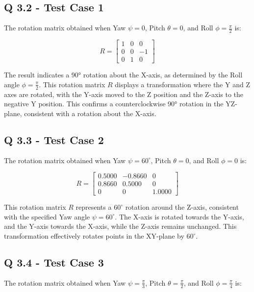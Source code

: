 \subsection{Q 3.2 - Test Case 1}

The rotation matrix obtained when Yaw \( \psi = 0 \), Pitch \( \theta = 0 \), and Roll \( \phi = \frac{\pi}{2} \) is:

\[
R = 
\begin{bmatrix}
1 & 0 & 0 \\
0 & 0 & -1 \\
0 & 1 & 0
\end{bmatrix}
\]

The result indicates a 90° rotation about the X-axis, as determined by the Roll angle \(\phi = \frac{\pi}{2}\). This rotation matrix \( R \) displays a transformation where the Y and Z axes are rotated, with the Y-axis moved to the Z position and the Z-axis to the negative Y position. This confirms a counterclockwise 90° rotation in the YZ-plane, consistent with a rotation about the X-axis.

\subsection{Q 3.3 - Test Case 2}

The rotation matrix obtained when Yaw \( \psi = 60^\circ \), Pitch \( \theta = 0 \), and Roll \( \phi = 0 \) is:

\[
R = 
\begin{bmatrix}
0.5000 & -0.8660 & 0 \\
0.8660 & 0.5000 & 0 \\
0 & 0 & 1.0000
\end{bmatrix}
\]

This rotation matrix \( R \) represents a \( 60^\circ \) rotation around the Z-axis, consistent with the specified Yaw angle \( \psi = 60^\circ \). The X-axis is rotated towards the Y-axis, and the Y-axis towards the X-axis, while the Z-axis remains unchanged. This transformation effectively rotates points in the XY-plane by \( 60^\circ \).

\subsection{Q 3.4 - Test Case 3}

The rotation matrix obtained when Yaw \( \psi = \frac{\pi}{3} \), Pitch \( \theta = \frac{\pi}{2} \), and Roll \( \phi = \frac{\pi}{4} \) is:

